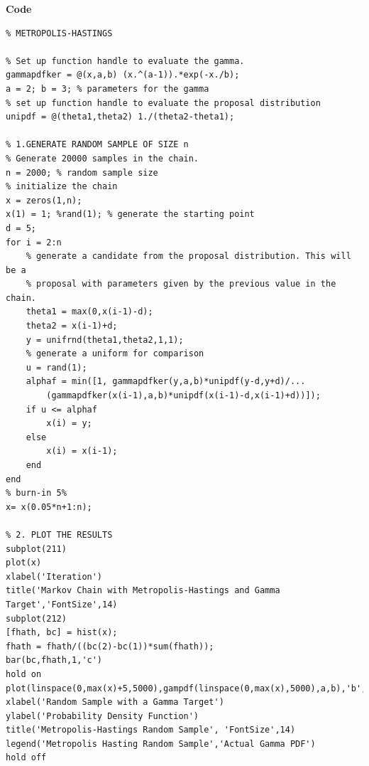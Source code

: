 \documentclass[12pt,a4paper]{article}
\begin{document}
\textbf{Code}
\begin{verbatim}
% METROPOLIS-HASTINGS

% Set up function handle to evaluate the gamma.
gammapdfker = @(x,a,b) (x.^(a-1)).*exp(-x./b);
a = 2; b = 3; % parameters for the gamma
% set up function handle to evaluate the proposal distribution
unipdf = @(theta1,theta2) 1./(theta2-theta1);

% 1.GENERATE RANDOM SAMPLE OF SIZE n
% Generate 20000 samples in the chain.
n = 2000; % random sample size
% initialize the chain
x = zeros(1,n);
x(1) = 1; %rand(1); % generate the starting point
d = 5;
for i = 2:n
    % generate a candidate from the proposal distribution. This will be a
    % proposal with parameters given by the previous value in the chain.
    theta1 = max(0,x(i-1)-d);
    theta2 = x(i-1)+d;
    y = unifrnd(theta1,theta2,1,1);
    % generate a uniform for comparison
    u = rand(1);
    alphaf = min([1, gammapdfker(y,a,b)*unipdf(y-d,y+d)/...
        (gammapdfker(x(i-1),a,b)*unipdf(x(i-1)-d,x(i-1)+d))]);
    if u <= alphaf
        x(i) = y;
    else
        x(i) = x(i-1);
    end
end
% burn-in 5%
x= x(0.05*n+1:n);

% 2. PLOT THE RESULTS
subplot(211)
plot(x)
xlabel('Iteration')
title('Markov Chain with Metropolis-Hastings and Gamma Target','FontSize',14)
subplot(212)
[fhath, bc] = hist(x);
fhath = fhath/((bc(2)-bc(1))*sum(fhath));
bar(bc,fhath,1,'c')
hold on
plot(linspace(0,max(x)+5,5000),gampdf(linspace(0,max(x),5000),a,b),'b','LineWidth',2);
xlabel('Random Sample with a Gamma Target')
ylabel('Probability Density Function')
title('Metropolis-Hastings Random Sample', 'FontSize',14)
legend('Metropolis Hasting Random Sample','Actual Gamma PDF')
hold off
\end{verbatim}
\clearpage
\end{document}
